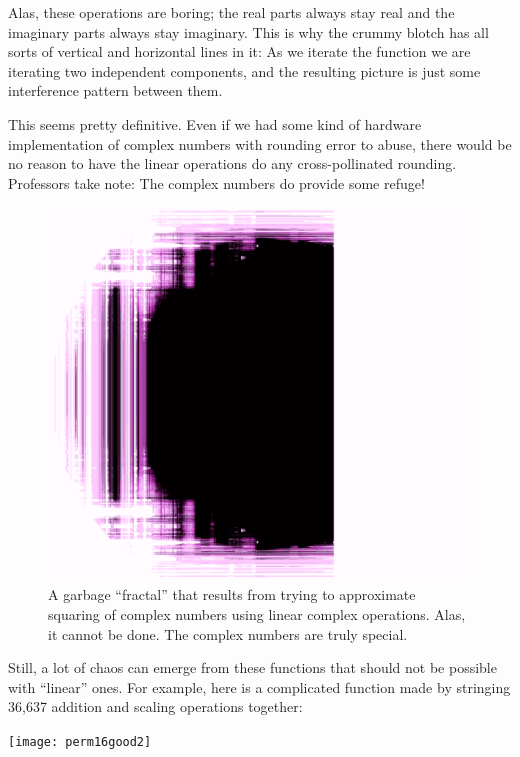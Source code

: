 \documentclass[twocolumn]{article}
\begin{document}
Alas, these operations are boring; the real parts always stay real and
the imaginary parts always stay imaginary. This is why the crummy
blotch has all sorts of vertical and horizontal lines in it: As we
iterate the function we are iterating two independent components, and
the resulting picture is just some interference pattern between them.

This seems pretty definitive. Even if we had some kind of hardware
implementation of complex numbers with rounding error to abuse, there
would be no reason to have the linear operations do any
cross-pollinated rounding. Professors take note: The complex numbers
do provide some refuge!

\begin{figure}[htp]
  \begin{center}
    \includegraphics[width=0.95 \linewidth]{squarebrot}
  \end{center}
  \caption{
    A garbage ``fractal'' that results from trying to approximate
    squaring of complex numbers using linear complex operations. Alas, it
    cannot be done. The complex numbers are truly special.
  } \label{fig:squarebrot}
\end{figure}

Still, a lot of chaos can emerge from these functions that should not
be possible with ``linear'' ones. For example, here is a complicated
function made by stringing 36,637 addition and scaling operations
together:

\begin{center}
\texttt{[image: perm16good2]}
\end{center}
\end{document}
